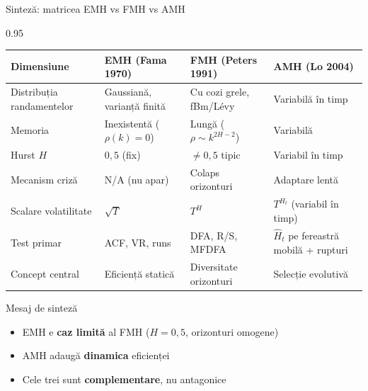 \documentclass[9pt, aspectratio=169, t]{beamer}
\begin{document}
\begin{frame}[shrink=15]{Sinteză: matricea EMH vs FMH vs AMH}
\begin{cminipage}{0.95\textwidth}
\renewcommand{\arraystretch}{1.2}
\centering
\small
\begin{tabular}{llll}
\toprule
\textbf{Dimensiune} & \textbf{EMH (Fama 1970)} & \textbf{FMH (Peters 1991)} & \textbf{AMH (Lo 2004)} \\
\midrule
Distribuția randamentelor & Gaussiană, varianță finită & Cu cozi grele, fBm/Lévy & Variabilă în timp \\
Memoria & Inexistentă ($\rho(k)=0$) & Lungă ($\rho\sim k^{2H-2}$) & Variabilă \\
Hurst $H$ & $0{,}5$ (fix) & $\neq 0{,}5$ tipic & Variabil în timp \\
Mecanism criză & N/A (nu apar) & Colaps orizonturi & Adaptare lentă \\
Scalare volatilitate & $\sqrt T$ & $T^H$ & $T^{H_t}$ (variabil în timp) \\
Test primar & ACF, VR, runs & DFA, R/S, MFDFA & $\hat H_t$ pe fereastră mobilă + rupturi \\
Concept central & Eficiență statică & Diversitate orizonturi & Selecție evolutivă \\
\bottomrule
\end{tabular}
\vspace{0.15cm}
\begin{exampleblock}{Mesaj de sinteză}
\begin{itemize}\setlength{\itemsep}{0pt}
    \item EMH e \textbf{caz limită} al FMH ($H=0{,}5$, orizonturi omogene)
    \item AMH adaugă \textbf{dinamica} eficienței
    \item Cele trei sunt \textbf{complementare}, nu antagonice
\end{itemize}
\end{exampleblock}
\end{cminipage}
\end{frame}
\end{document}
